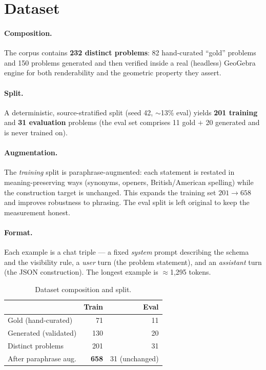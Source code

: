 \documentclass[11pt]{article}
\begin{document}
\section{Dataset}
\paragraph{Composition.} The corpus contains \textbf{232 distinct problems}: 82 hand-curated
``gold'' problems and 150 problems generated and then verified inside a real (headless)
GeoGebra engine for both renderability and the geometric property they assert.

\paragraph{Split.} A deterministic, source-stratified split (seed 42, $\sim$13\% eval) yields
\textbf{201 training} and \textbf{31 evaluation} problems (the eval set comprises 11 gold $+$
20 generated and is never trained on).

\paragraph{Augmentation.} The \emph{training} split is paraphrase-augmented: each statement is
restated in meaning-preserving ways (synonyms, openers, British/American spelling) while the
construction target is unchanged. This expands the training set $201 \rightarrow 658$ and
improves robustness to phrasing. The eval split is left original to keep the measurement
honest.

\paragraph{Format.} Each example is a chat triple --- a fixed \emph{system} prompt describing
the schema and the visibility rule, a \emph{user} turn (the problem statement), and an
\emph{assistant} turn (the JSON construction). The longest example is $\approx$1{,}295 tokens.

\begin{table}[h]
\centering
\caption{Dataset composition and split.}
\begin{tabular}{lrr}
\toprule
 & \textbf{Train} & \textbf{Eval} \\
\midrule
Gold (hand-curated)      & 71  & 11 \\
Generated (validated)    & 130 & 20 \\
\midrule
Distinct problems        & 201 & 31 \\
After paraphrase aug.    & \textbf{658} & 31 (unchanged) \\
\bottomrule
\end{tabular}
\end{table}
\end{document}
